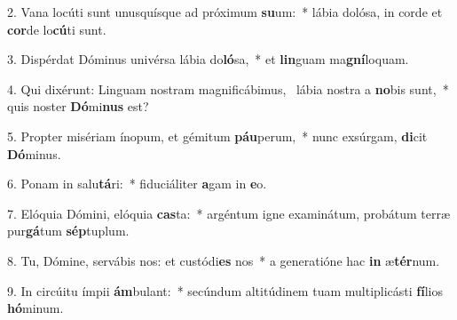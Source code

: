 2. Vana locúti sunt unusquísque ad próximum \textbf{su}um:~*  lábia dolósa, in corde et \textbf{cor}de lo\textbf{cú}ti sunt.\

3. Dispérdat Dóminus univérsa lábia do\textbf{ló}sa,~*  et \textbf{lin}guam ma\textbf{gní}loquam.\

4. Qui dixérunt: Linguam nostram magnificábimus, \dag\  lábia nostra a \textbf{no}bis sunt,~*  quis noster \textbf{Dó}mi\textbf{nus} est?\

5. Propter misériam ínopum, et gémitum \textbf{páu}perum,~*  nunc exsúrgam, \textbf{di}cit \textbf{Dó}minus.\

6. Ponam in salu\textbf{tá}ri:~*  fiduciáliter \textbf{a}gam in \textbf{e}o.\

7. Elóquia Dómini, elóquia \textbf{cas}ta:~*  argéntum igne examinátum, probátum terræ pur\textbf{gá}tum \textbf{sép}tuplum.\

8. Tu, Dómine, servábis nos: et custódi\textbf{es} nos~*  a generatióne hac \textbf{in} æ\textbf{tér}num.\

9. In circúitu ímpii \textbf{ám}bulant:~*  secúndum altitúdinem tuam multiplicásti \textbf{fí}lios \textbf{hó}minum.\

